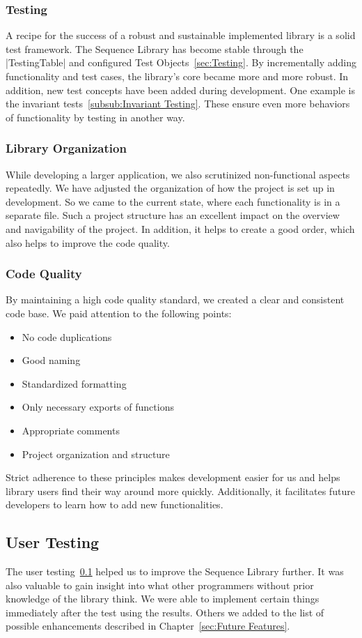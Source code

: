 \subsubsection{Testing}
\label{subsub:Testing}
A recipe for the success of a robust and sustainable implemented library is a
solid test framework. The Sequence Library has become stable through the
|TestingTable| and configured Test Objects~\ref{sec:Testing}. By incrementally adding
functionality and test cases, the library's core became more and more robust.
In addition, new test concepts have been added during development. One example
is the invariant tests~\ref{subsub:Invariant Testing}. These ensure even more
behaviors of functionality by testing in another way.

\subsubsection{Library Organization}
\label{subsub:Library Organisation}
While developing a larger application, we also scrutinized non-functional
aspects repeatedly. We have adjusted the organization of how the project is set up
in development. So we came to the current state, where each
functionality is in a separate file. Such a project structure has an excellent
impact on the overview and navigability of the project. In addition, it helps
to create a good order, which also helps to improve the code quality.

\subsubsection{Code Quality}
\label{subsub:Code Quality}
By maintaining a high code quality standard, we created a clear and consistent
code base. We paid attention to the following points:

\begin{itemize}
  \item{No code duplications}
  \item{Good naming}
  \item{Standardized formatting}
  \item{Only necessary exports of functions}
  \item{Appropriate comments}
  \item{Project organization and structure}
\end{itemize}

Strict adherence to these principles makes development easier for us and helps
library users find their way around more quickly. Additionally, it facilitates
future developers to learn how to add new functionalities.

\subsection{User Testing}
\label{sub:User Testing}
The user testing~\ref{sub:User Testing} helped us to improve the Sequence Library further. It was also
valuable to gain insight into what other programmers without prior knowledge of
the library think. We were able to implement certain things immediately after
the test using the results. Others we added to the list of possible enhancements described in
Chapter~\ref{sec:Future Features}.
